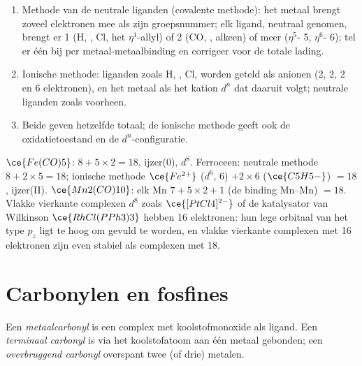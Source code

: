 \begin{method}\label{met:b3:organometallic-bonding:count}
\begin{enumerate}
  \item Methode van de neutrale liganden (covalente methode): het metaal
        brengt zoveel elektronen mee als zijn groepsnummer; elk ligand,
        neutraal genomen, brengt er 1 (H, , Cl, het
        $\eta^1$-allyl) of 2 (CO, , alkeen) of meer ($\eta^5$- 5, $\eta^6$- 6); tel er één bij per
        metaal-metaalbinding en corrigeer voor de totale lading.
  \item Ionische methode: liganden zoals H, , Cl,  worden geteld als anionen (2, 2,
        2 en 6 elektronen), en het metaal als het kation $d^n$ dat daaruit volgt; neutrale liganden
        zoals voorheen.
  \item Beide geven hetzelfde totaal; de ionische methode geeft ook de
        oxidatietoestand
        en de $d^n$-configuratie.
\end{enumerate}
\end{method}

\begin{example}[Tellen]\label{ex:b3:organometallic-bonding:count}
$\ce{Fe(CO)5}$: $8 + 5 \times 2 = 18$, ijzer(0), $d^8$. Ferroceen: neutrale methode $8 + 2 \times 5 = 18$; ionische methode
$\ce{Fe^{2+}}$ ($d^6$, 6) $+ 2 \times 6$ ($\ce{C5H5-}$) $= 18$, ijzer(II). $\ce{Mn2(CO)10}$: elk Mn $7 + 5 \times 2 + 1$ (de binding Mn--Mn) $= 18$. Vlakke vierkante complexen $d^8$ zoals $\ce{[PtCl4]^{2-}}$ of de katalysator van Wilkinson
$\ce{RhCl(PPh3)3}$ hebben 16 elektronen: hun lege orbitaal van het type $p_z$ ligt te hoog om gevuld te worden, en
vlakke vierkante complexen met 16 elektronen zijn even stabiel als
complexen met 18.
\end{example}

\section{Carbonylen en fosfines}

\begin{definition}[Metaalcarbonylen]\label{def:b3:organometallic-bonding:carbonyl}
Een \emph{metaalcarbonyl} is een complex met
koolstofmonoxide als ligand. Een
\emph{terminaal carbonyl} is via het koolstofatoom
aan één metaal gebonden; een
\emph{overbruggend carbonyl} overspant
twee (of drie) metalen.
\end{definition}

